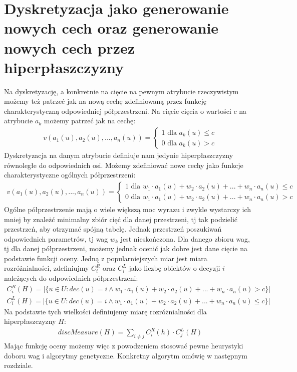 \documentclass[magisterska]{pracamgr}
\theoremstyle{plain}
\theoremstyle{definition}
\theoremstyle{remark}
\begin{document}
\section{Dyskretyzacja jako generowanie nowych cech oraz generowanie nowych cech przez hiperpłaszczyzny}
Na dyskretyzację, a konkretnie na cięcie na pewnym atrybucie rzeczywistym możemy też patrzeć
jak na nową cechę zdefiniowaną przez funkcję charakterystyczną odpowiedniej półprzestrzeni. Na cięcie cięcia o wartości
$c$ na atrybucie $a_k$ możemy patrzeć jak na cechę:
\begin{align*}
v(a_1(u), a_2(u), ..., a_n(u)) = \begin{cases} 1 \text{ dla } a_k(u) \leq c \\ 0 \text{ dla } a_k(u) > c \end{cases}
\end{align*}
Dyskretyzacja na danym atrybucie definiuje nam jedynie hiperpłaszczyzny równoległe do odpowiednich osi. 
Możemy zdefiniować nowe cechy jako funkcje charakterystyczne ogólnych półprzestrzeni:
\begin{align*}
v(a_1(u), a_2(u), ..., a_n(u)) = \begin{cases} 1 \text{ dla } w_1 \cdot a_1(u) + w_2 \cdot a_2(u) + ... + w_n \cdot a_n(u) \leq c 
\\ 0 \text{ dla } w_1 \cdot a_1(u) + w_2 \cdot a_2(u) + ... + w_n \cdot a_n(u) > c \end{cases}
\end{align*}
Ogólne półprzestrzenie mają o wiele większą moc wyrazu i zwykle wystarczy ich mniej by znależć minimalny zbiór cięć dla
danej przestrzeni, tj tak podzielić przestrzeń, aby otrzymać spójną tabelę.
Jednak przestrzeń poszukiwań odpowiednich parametrów, tj wag $w_k$ jest nieskończona. Dla danego zbioru wag, tj dla danej półprzestrzeni,
możemy jednak ocenić jak dobre jest dane cięcie na podstawie funkcji oceny. Jedną z popularniejszych miar jest miara rozróżnialności, 
zdefiniujmy $C_i^R$ oraz $C_i^L$ jako liczbę obiektów o decyzji $i$ należących do odpowiednich półprzestrzeni:
\begin{align*}
C_i^R(H) = |\{u \in U: dec(u) = i \wedge w_1 \cdot a_1(u) + w_2 \cdot a_2(u) + ... + w_n \cdot a_n(u) > c\}| \\
C_i^L(H) = |\{u \in U: dec(u) = i \wedge w_1 \cdot a_1(u) + w_2 \cdot a_2(u) + ... + w_n \cdot a_n(u) \leq c\}|
\end{align*}
Na podstawie tych wielkości definiujemy miarę rozróżnialności dla hiperpłaszczyzny $H$:
\begin{align*}
discMeasure(H) = \sum_{i \neq j} C_i^R(h) \cdot C_j^L(H)
\end{align*}
Mając funkcję oceny możemy więc z powodzeniem stosować pewne heurystyki doboru wag i algorytmy genetyczne. Konkretny algorytm omówię w następnym
rozdziale.
\end{document}
